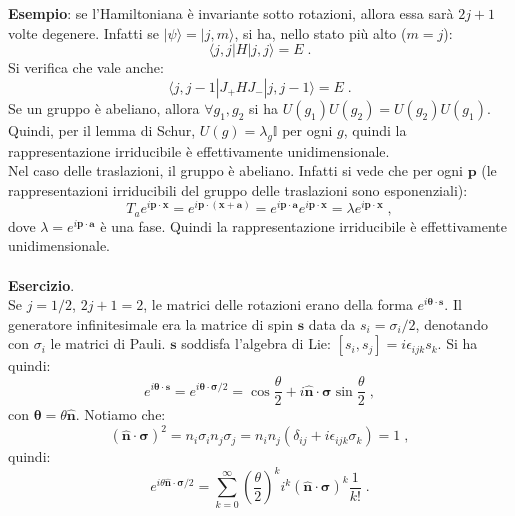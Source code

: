 \documentclass[10pt,a4paper]{report}
\theoremstyle{definition}
\numberwithin{equation}{section}
\newcommand{\bra}{\langle}
\newcommand{\ket}{\rangle}
\begin{document}
\textbf{Esempio}: se l'Hamiltoniana è invariante sotto rotazioni, allora essa sarà $2j+1$ volte degenere. Infatti se $|\psi\ket=|j,m\ket$, si ha, nello stato più alto ($m=j$):
\begin{equation}
\bra j,j|H|j,j\ket=E\;.
\end{equation}
Si verifica che vale anche:
\begin{equation}
\bra j,j-1|J_+HJ_-|j,j-1\ket=E\;.
\end{equation}
Se un gruppo è abeliano, allora $\forall g_1,g_2$ si ha $U(g_1)U(g_2)=U(g_2)U(g_1)$. Quindi, per il lemma di Schur, $U(g)=\lambda_g\mathbb{I}$ per ogni $g$, quindi la rappresentazione irriducibile è effettivamente unidimensionale. \\
Nel caso delle traslazioni, il gruppo è abeliano. Infatti si vede che per ogni $\mathbf{p}$ (le rappresentazioni irriducibili del gruppo delle traslazioni sono esponenziali):
\begin{equation}
T_a e^{i\mathbf{p}\cdot\mathbf{x}}=e^{i\mathbf{p}\cdot(\mathbf{x}+\mathbf{a})}=e^{i\mathbf{p}\cdot\mathbf{a}}e^{i\mathbf{p}
\cdot\mathbf{x}}=\lambda e^{i\mathbf{p}\cdot\mathbf{x}}\;,
\end{equation}
dove $\lambda=e^{i\mathbf{p}\cdot\mathbf{a}}$ è una fase. Quindi la rappresentazione irriducibile è effettivamente unidimensionale. \\
\\
\textbf{Esercizio}. \\
Se $j=1/2$, $2j+1=2$, le matrici delle rotazioni erano della forma $e^{i\boldsymbol{\theta}\cdot\mathbf{s}}$. Il generatore infinitesimale era la matrice di spin $\mathbf{s}$ data da $s_i=\sigma_i/2$, denotando con $\sigma_i$ le matrici di Pauli. $\mathbf{s}$ soddisfa l'algebra di Lie: $[s_i,s_j]=i\epsilon_{ijk}s_k$. Si ha quindi:
\begin{equation}
e^{i\boldsymbol{\theta}\cdot\mathbf{s}}=e^{i\boldsymbol{\theta}\cdot\boldsymbol{\sigma}/2}=\cos\frac{\theta}{2}+i\hat{\mathbf{n}}\cdot\boldsymbol{\sigma}\sin\frac{\theta}{2}\;,
\end{equation}
con $\boldsymbol{\theta}=\theta\hat{\mathbf{n}}$. Notiamo che:
\begin{equation}
(\hat{\mathbf{n}}\cdot\boldsymbol{\sigma})^2=n_i\sigma_in_j\sigma_j=n_in_j(\delta_{ij}+i\epsilon_{ijk}\sigma_k)=1\;,
\end{equation}
quindi:
\begin{equation}
e^{i\theta\hat{\mathbf{n}}\cdot\boldsymbol{\sigma}/2}=\sum_{k=0}^{\infty}\left(\frac{\theta}{2}\right)^k i^k (\hat{\mathbf{n}}\cdot\boldsymbol{\sigma})^k\frac{1}{k!}\;.
\end{equation}
\end{document}
